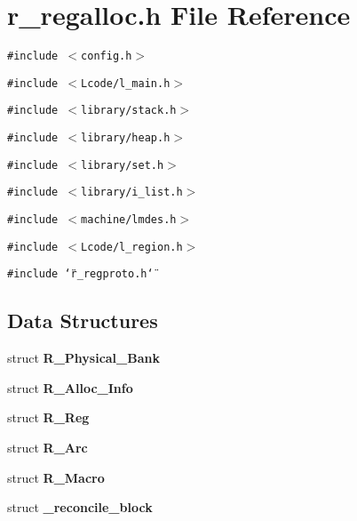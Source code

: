 \section{r\_\-regalloc.h File Reference}
\label{r__regalloc_8h}
{\tt \#include $<$config.h$>$}\par
{\tt \#include $<$Lcode/l\_\-main.h$>$}\par
{\tt \#include $<$library/stack.h$>$}\par
{\tt \#include $<$library/heap.h$>$}\par
{\tt \#include $<$library/set.h$>$}\par
{\tt \#include $<$library/i\_\-list.h$>$}\par
{\tt \#include $<$machine/lmdes.h$>$}\par
{\tt \#include $<$Lcode/l\_\-region.h$>$}\par
{\tt \#include \char`\"{}r\_\-regproto.h\char`\"{}}\par
\subsection*{Data Structures}
\begin{CompactItemize}
\item 
struct \bf{R\_\-Physical\_\-Bank}
\item 
struct \bf{R\_\-Alloc\_\-Info}
\item 
struct \bf{R\_\-Reg}
\item 
struct \bf{R\_\-Arc}
\item 
struct \bf{R\_\-Macro}
\item 
struct \bf{\_\-reconcile\_\-block}
\end{CompactItemize}
